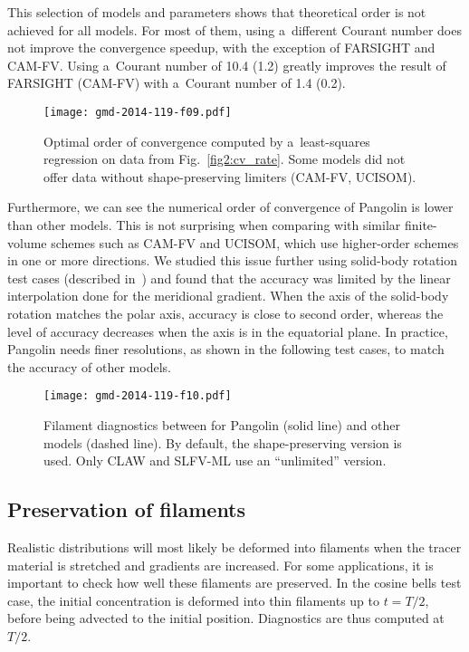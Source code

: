    This selection of models and parameters shows that theoretical order
   is not achieved for all models. For most of them, using a~different
   Courant number does not improve the convergence speedup, with the
   exception of FARSIGHT and CAM-FV.  Using a~Courant number of 10.4 (1.2)
   greatly improves the result of FARSIGHT (CAM-FV) with a~Courant
   number of 1.4 (0.2).


\begin{figure*}[t]
  \centering
\texttt{[image: gmd-2014-119-f09.pdf]}
\caption{Optimal order of convergence computed by a~least-squares regression on
    data from Fig.~\ref{fig2:cv_rate}. Some models did not offer data without
  shape-preserving limiters (CAM-FV, UCISOM).}
\label{fig2:num_cv_rate}
\end{figure*}



   Furthermore, we can see the numerical order of convergence of Pangolin is
   lower than other models. This is not surprising when comparing with similar
   finite-volume schemes such as CAM-FV and UCISOM, which use higher-order schemes in
   one or more directions. We studied this issue further using solid-body
   rotation test cases (described in~\cite{Williamson1992}) and found that the
   accuracy was limited by the linear interpolation done for the meridional
   gradient. When the axis of the solid-body rotation matches the polar axis,
   accuracy is close to second order, whereas the level of accuracy decreases
   when the axis is in the equatorial plane. In practice, Pangolin needs finer
   resolutions, as shown in the following test cases, to match the accuracy of
   other models.

\begin{figure*}[t]
  \centering
\texttt{[image: gmd-2014-119-f10.pdf]}
\caption{Filament diagnostics between for Pangolin (solid line) and other
  models (dashed line).  By default, the shape-preserving version is used. Only
CLAW and SLFV-ML use an ``unlimited'' version.}
\label{fig2:filaments}
\end{figure*}

\subsection{Preservation of filaments}
   \label{subsec:preserv}

   Realistic distributions will most likely be deformed into filaments when the
   tracer material is stretched and gradients are increased. For some
   applications, it is important to check how well these filaments are
   preserved. In the cosine bells test case, the initial concentration is
   deformed into thin filaments up to $t=T/2$, before being advected to the
   initial position. Diagnostics are thus computed at $T/2$.


